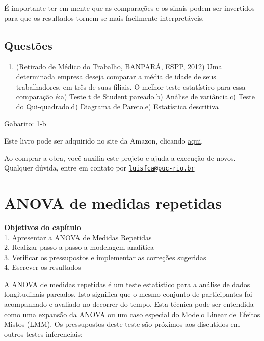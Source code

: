 \documentclass[
]{book}
\providecommand{\tightlist}{%
  \setlength{\itemsep}{0pt}\setlength{\parskip}{0pt}}
\newenvironment{objectives}{
  \definecolor{shadecolor}{rgb}{0, 0, 0}  %
  \color{white}
  \begin{shaded}}
 {\end{shaded}}
\begin{document}
É importante ter em mente que as comparações e os sinais podem ser invertidos para que os resultados tornem-se mais facilmente interpretáveis.

\hypertarget{questuxf5es-6}{%
\section{Questões}\label{questuxf5es-6}}

\begin{enumerate}
\def\labelenumi{\arabic{enumi}.}
\tightlist
\item
  (Retirado de Médico do Trabalho, BANPARÁ, ESPP, 2012) Uma determinada empresa deseja comparar a média de idade de seus trabalhadores, em três de suas filiais. O melhor teste estatístico para essa comparação é:a) Teste t de Student pareado.b) Análise de variância.c) Teste do Qui-quadrado.d) Diagrama de Pareto.e) Estatística descritiva
\end{enumerate}

Gabarito: 1-b

Este livro pode ser adquirido no site da Amazon, clicando \href{https://www.amazon.com.br/gp/product/B097CP7T9M?pf_rd_r=RDZC8XYMBC1WY69T0J8K\&pf_rd_p=abb22e6b-8812-4b76-a424-5f0b098d2c90\&pd_rd_r=ceec1911-f409-4acd-ac8f-2d5bc68dac43\&pd_rd_w=wMUzJ\&pd_rd_wg=ZK85a\&ref_=pd_gw_unk}{aqui}.

Ao comprar a obra, você auxilia este projeto e ajuda a execução de novos. Qualquer dúvida, entre em contato por \href{mailto:luisfca@puc-rio.br}{\nolinkurl{luisfca@puc-rio.br}}

\hypertarget{anova-de-medidas-repetidas}{%
\chapter{ANOVA de medidas repetidas}\label{anova-de-medidas-repetidas}}

\begin{objectives}
\textbf{Objetivos do capítulo}\\
1. Apresentar a ANOVA de Medidas Repetidas\\
2. Realizar passo-a-passo a modelagem analítica\\
3. Verificar os pressupostos e implementar as correções sugeridas\\
4. Escrever os resultados

\end{objectives}

A ANOVA de medidas repetidas é um teste estatístico para a análise de dados longitudinais pareados. Isto significa que o mesmo conjunto de participantes foi acompanhado e avaliado no decorrer do tempo. Esta técnica pode ser entendida como uma expansão da ANOVA ou um caso especial do Modelo Linear de Efeitos Mistos (LMM). Os pressupostos deste teste são próximos aos discutidos em outros testes inferenciais:
\end{document}
